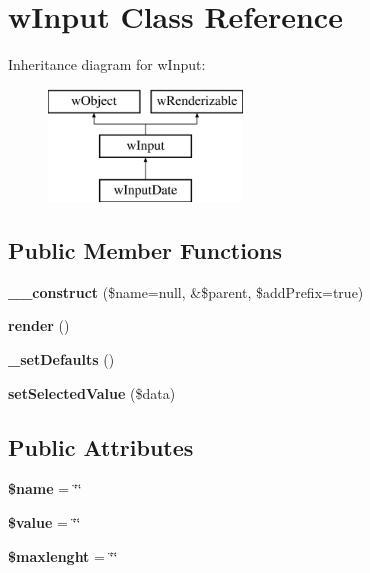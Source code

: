 \hypertarget{classwInput}{
\section{wInput Class Reference}
\label{classwInput}
}
Inheritance diagram for wInput:\begin{figure}[H]
\begin{center}
\leavevmode
\includegraphics[height=3.000000cm]{classwInput}
\end{center}
\end{figure}
\subsection*{Public Member Functions}
\begin{DoxyCompactItemize}
\item 
\hypertarget{classwInput_a41a19c5dc7c455cbb10cf4ff2bf3472d}{
{\bfseries \_\-\_\-construct} (\$name=null, \&\$parent, \$addPrefix=true)}
\label{classwInput_a41a19c5dc7c455cbb10cf4ff2bf3472d}

\item 
\hypertarget{classwInput_a78266b67a1bcac37ba3163ceed00bd30}{
{\bfseries render} ()}
\label{classwInput_a78266b67a1bcac37ba3163ceed00bd30}

\item 
\hypertarget{classwInput_adb8748e4bc9ad4d403f96c82c0db7f3e}{
{\bfseries \_\-setDefaults} ()}
\label{classwInput_adb8748e4bc9ad4d403f96c82c0db7f3e}

\item 
\hypertarget{classwInput_addbd5fd61e8330493ab9b9a1e652e59c}{
{\bfseries setSelectedValue} (\$data)}
\label{classwInput_addbd5fd61e8330493ab9b9a1e652e59c}

\end{DoxyCompactItemize}
\subsection*{Public Attributes}
\begin{DoxyCompactItemize}
\item 
\hypertarget{classwInput_aad699a854d8db38391bca9cf7b518ff2}{
{\bfseries \$name} = \char`\"{}\char`\"{}}
\label{classwInput_aad699a854d8db38391bca9cf7b518ff2}

\item 
\hypertarget{classwInput_a3c1546fbbafc770d3666ab9f530d9c7f}{
{\bfseries \$value} = \char`\"{}\char`\"{}}
\label{classwInput_a3c1546fbbafc770d3666ab9f530d9c7f}

\item 
\hypertarget{classwInput_ada1d043aad21f34c8729f4904c4a6b76}{
{\bfseries \$maxlenght} = \char`\"{}\char`\"{}}
\label{classwInput_ada1d043aad21f34c8729f4904c4a6b76}

\end{DoxyCompactItemize}


